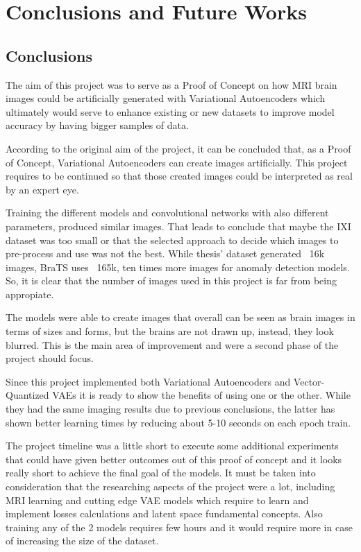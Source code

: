 \chapter{Conclusions and Future Works}

\section{Conclusions}

The aim of this project was to serve as a Proof of Concept on how MRI brain images could be artificially generated with Variational Autoencoders which ultimately would serve to enhance existing or new datasets to improve model accuracy by having bigger samples of data.

According to the original aim of the project, it can be concluded that, as a Proof of Concept, Variational Autoencoders can create images artificially. This project requires to be continued so that those created images could be interpreted as real by an expert eye.

Training the different models and convolutional networks with also different parameters, produced similar images. That leads to conclude that maybe the IXI dataset was too small or that the selected approach to decide which images to pre-process and use was not the best. While thesis' dataset generated ~16k images, BraTS \cite{brats} uses ~165k, ten times more images for anomaly detection models. So, it is clear that the number of images used in this project is far from being appropiate.

The models were able to create images that overall can be seen as brain images in terms of sizes and forms, but the brains are not drawn up, instead, they look blurred. This is the main area of improvement and were a second phase of the project should focus.

Since this project implemented both Variational Autoencoders and Vector-Quantized VAEs it is ready to show the benefits of using one or the other. While they had the same imaging results due to previous conclusions, the latter has shown better learning times by reducing about 5-10 seconds on each epoch train.

The project timeline was a little short to execute some additional experiments that could have given better outcomes out of this proof of concept and it looks really short to achieve the final goal of the models. It must be taken into consideration that the researching aspects of the project were a lot, including MRI learning and cutting edge VAE models which require to learn and implement losses calculations and latent space fundamental concepts. Also training any of the 2 models requires few hours and it would require more in case of increasing the size of the dataset.

